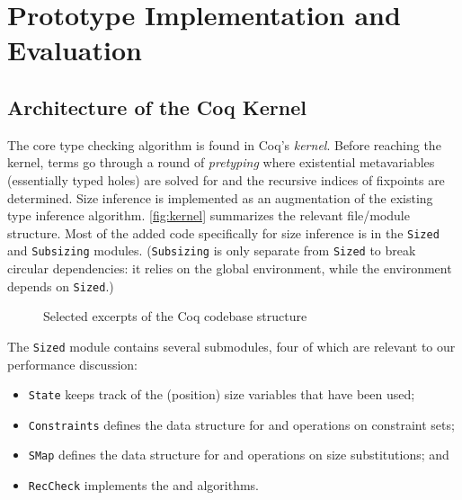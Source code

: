 \section{Prototype Implementation and Evaluation} \label{sec:impl}


\subsection{Architecture of the Coq Kernel}

The core type checking algorithm is found in Coq's \emph{kernel}.
Before reaching the kernel, terms go through a round of \emph{pretyping}
where existential metavariables (essentially typed holes) are solved for
and the recursive indices of fixpoints are determined.
Size inference is implemented as an augmentation of the existing type inference algorithm.
\autoref{fig:kernel} summarizes the relevant file/module structure.
Most of the added code specifically for size inference is in the \texttt{Sized} and \texttt{Subsizing} modules.
(\texttt{Subsizing} is only separate from \texttt{Sized} to break circular dependencies: it relies on the global environment, while the environment depends on \texttt{Sized}.)

\begin{figure}
\caption{Selected excerpts of the Coq codebase structure}
\label{fig:kernel}
\end{figure}

The \texttt{Sized} module contains several submodules, four of which are relevant to our performance discussion:
\begin{itemize}
  \item \texttt{State} keeps track of the (position) size variables that have been used;
  \item \texttt{Constraints} defines the data structure for and operations on constraint sets;
  \item \texttt{SMap} defines the data structure for and operations on size substitutions; and
  \item \texttt{RecCheck} implements the \RecCheck and \solve algorithms.
\end{itemize}

